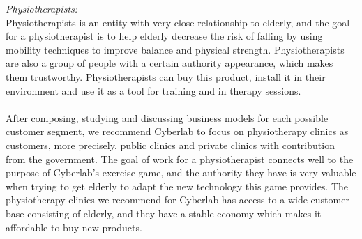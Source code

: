 \emph{Physiotherapists:} \\
Physiotherapists is an entity with very close relationship to elderly, and the goal for a physiotherapist is to help elderly decrease the risk of falling by using mobility techniques to improve balance and physical strength. Physiotherapists are also a group of people with a certain authority appearance, which makes them trustworthy. Physiotherapists can buy this product, install it in their environment and use it as a tool for training and in therapy sessions.\\ \\
After composing, studying and discussing business models for each possible customer segment, we recommend Cyberlab to focus on physiotherapy clinics as customers, more precisely, public clinics and private clinics with contribution from the government. The goal of work for a physiotherapist connects well to the purpose of Cyberlab's exercise game, and the authority they have is very valuable when trying to get elderly to adapt the new technology this game provides. The physiotherapy clinics we recommend for Cyberlab has access to a wide customer base consisting of elderly, and they have a stable economy which makes it affordable to buy new products. 

